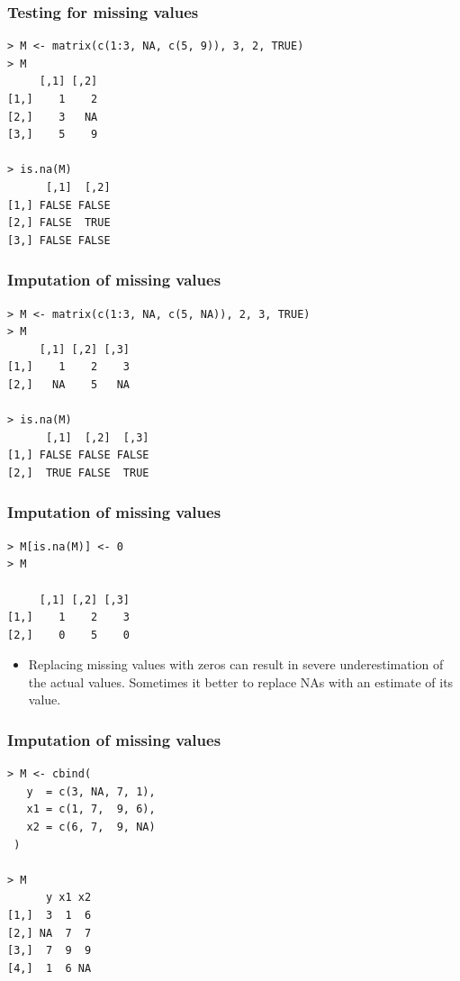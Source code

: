 \documentclass[xcolor=dvipsnames, xcolor=table]{beamer} %
\theoremstyle{mystyle}
\begin{document}
\begin{frame}[fragile] %

\frametitle{Testing for missing values}

\begin{verbatim}
> M <- matrix(c(1:3, NA, c(5, 9)), 3, 2, TRUE)
> M
     [,1] [,2]
[1,]    1    2
[2,]    3   NA
[3,]    5    9

> is.na(M)
      [,1]  [,2]
[1,] FALSE FALSE
[2,] FALSE  TRUE
[3,] FALSE FALSE
\end{verbatim}

\end{frame}

\begin{frame}[fragile] %

\frametitle{Imputation of missing values}

\begin{verbatim}
> M <- matrix(c(1:3, NA, c(5, NA)), 2, 3, TRUE)
> M
     [,1] [,2] [,3]
[1,]    1    2    3
[2,]   NA    5   NA

> is.na(M)
      [,1]  [,2]  [,3]
[1,] FALSE FALSE FALSE
[2,]  TRUE FALSE  TRUE

\end{verbatim}

\end{frame}

\begin{frame}[fragile] %

\frametitle{Imputation of missing values}

\begin{verbatim}
> M[is.na(M)] <- 0
> M

     [,1] [,2] [,3]
[1,]    1    2    3
[2,]    0    5    0
\end{verbatim}

\begin{itemize}
\item Replacing missing values with zeros can result in severe underestimation of the actual values. Sometimes it better to replace NAs with an estimate of its value.
\end{itemize}

\end{frame}

\begin{frame}[fragile] %

\frametitle{Imputation of missing values}

\begin{verbatim} 
> M <- cbind(
   y  = c(3, NA, 7, 1),
   x1 = c(1, 7,  9, 6),
   x2 = c(6, 7,  9, NA)
 )

> M
      y x1 x2
[1,]  3  1  6
[2,] NA  7  7
[3,]  7  9  9
[4,]  1  6 NA
\end{verbatim}

\end{frame}
\end{document}
